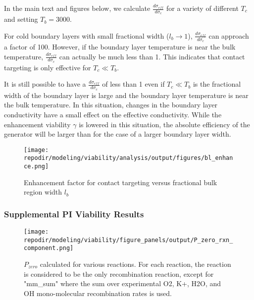 
In the main text and figures below, we calculate $\frac{d\sigma_{eff}}{d\sigma_{c}}$ for a variety of different $T_{c}$ and setting $T_{b} = 3000$.

For cold boundary layers with small fractional width ($l_{b}\rightarrow1$), $\frac{d\sigma_{eff}}{d\sigma_{c}}$ can approach a factor of 100. However, if the boundary layer temperature is near the bulk temperature, $\frac{d\sigma_{eff}}{d\sigma_{c}}$ can actually be much less than 1. This indicates that contact targeting is only effective for $T_{c} \ll T_{b}$. 

It is still possible to have a $\frac{d\sigma_{eff}}{d\sigma_{c}}$ of less than 1 even if $T_{c} \ll T_{b}$ is the fractional width of the boundary layer is large and the  boundary layer temperature is near the bulk temperature. In this situation, changes in the boundary layer conductivity have a small effect on the effective conductivity. While the enhancement viability $\gamma$ is lowered in this situation, the absolute efficiency of the generator will be larger than for the case of a larger boundary layer width.

\begin{figure}[h]
    \centering
    \texttt{[image: \\repodir/modeling/viability/analysis/output/figures/bl\_enhance.png]} 
    \caption{Enhancement factor for contact targeting versus fractional bulk region width $l_b$}%
    \label{fig:SI_bl_enhance}
\end{figure}

\clearpage

\subsubsection{Supplemental PI Viability Results}

\begin{figure}[h]
    \centering
    \texttt{[image: \\repodir/modeling/viability/figure\_panels/output/P\_zero\_rxn\_component.png]} 
    \caption{$P_{zero}$ calculated for various reactions. For each reaction, the reaction is considered to be the only recombination reaction, except for "mm\_sum" where the sum over experimental O2, K+, H2O, and OH mono-molecular recombination rates is used.}
    \label{fig:SI_P_zero_rxn_component}
\end{figure}


